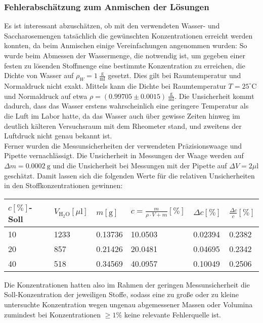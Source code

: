 \documentclass[11pt,a4paper,oneside]{scrartcl}
\begin{document}




\subsubsection{Fehlerabschätzung zum Anmischen der Lösungen}\label{sac_loes_fehler}
Es ist interessant abzuschätzen, ob mit den verwendeten Wasser- und Saccharosemengen tatsächlich die gewünschten Konzentrationen erreicht werden konnten, da beim Anmischen einige Vereinfachungen angenommen wurden:
So wurde beim Abmessen der Wassermenge, die notwendig ist, um gegeben einer festen zu lösenden Stoffmenge eine bestimmte Konzentration zu erreichen, die Dichte von Wasser auf $\rho_W=1\ \mathrm{\frac{g}{ml}}$ gesetzt. Dies gilt bei Raumtemperatur und Normaldruck nicht exakt. 
Mittels \cite{nist_water} kann die Dichte bei Raumtemperatur $T=25^\circ\mathrm C$ und Normaldruck auf etwa $\rho=(0.99705\pm0.0015)\ \mathrm{\frac{g}{ml}}$. Die Unsicherheit kommt dadurch, dass das Wasser erstens wahrscheinlich eine geringere Temperatur als die Luft im Labor hatte, da das Wasser auch über gewisse Zeiten hinweg im deutlich kälteren Versuchsraum mit dem Rheometer stand, und zweitens der Luftdruck nicht genau bekannt ist. \\
Ferner wurden die Messunsicherheiten der verwendeten Präzisionswaage und Pipette vernachlässigt. Die Unsicherheit in Messungen der Waage werden auf $\Delta m=0.0002\ \mathrm g$ und die Unsicherheit bei Messungen mit der Pipette auf $\Delta V=2\mu\mathrm l$ geschätzt. Damit lassen sich die folgenden Werte für die relativen Unsicherheiten in den Stoffkonzentrationen gewinnen:
\begin{table}[H]
    \centering
    \begin{tabular}{llllll}
    \hline
        $c [\%]$-Soll & $V_{\mathrm{H_2O}} [\mu \mathrm l]$ & $m [\mathrm g]$ & $c=\frac{m}{\rho\cdot V+m}[\%]$ & $\Delta c[\%]$ & $\frac{\Delta c}{c}[\%]$ \\ \hline
        10 & 1233 & 0.13736 & 10.0503 & 0.02394 & 0.2382 \\ 
        20 & 857 & 0.21426 & 20.0481 & 0.04695 & 0.2342 \\ 
        40 & 518 & 0.34569 & 40.0957 & 0.10049 & 0.2506 \\  \hline
    \end{tabular}
\end{table}
Die Konzentrationen hatten also im Rahmen der geringen Messunsicherheit die Soll-Konzentration der jeweiligen Stoffe, sodass eine zu große oder zu kleine untersuchte Konzentration wegen ungenau abgemessener Massen oder Volumina zumindest bei Konzentrationen $\geq 1\%$ keine relevante Fehlerquelle ist.
\end{document}
